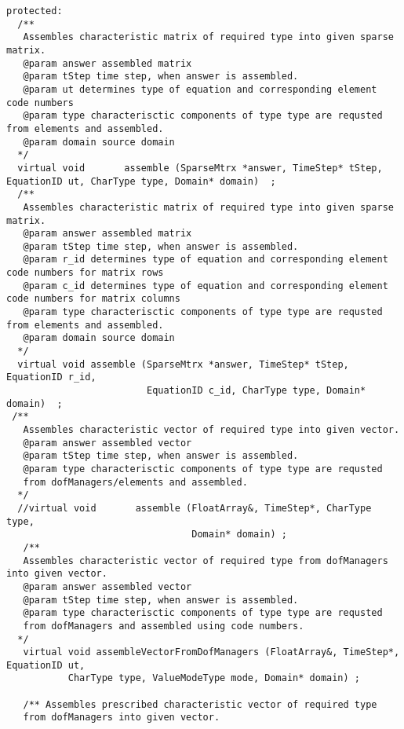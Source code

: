 \documentclass[12pt,draft]{article}
\begin{document}
{\begin{verbatim}
protected:
  /**
   Assembles characteristic matrix of required type into given sparse matrix.
   @param answer assembled matrix
   @param tStep time step, when answer is assembled.
   @param ut determines type of equation and corresponding element code numbers
   @param type characterisctic components of type type are requsted from elements and assembled.
   @param domain source domain
  */
  virtual void       assemble (SparseMtrx *answer, TimeStep* tStep, EquationID ut, CharType type, Domain* domain)  ;
  /**
   Assembles characteristic matrix of required type into given sparse matrix.
   @param answer assembled matrix
   @param tStep time step, when answer is assembled.
   @param r_id determines type of equation and corresponding element code numbers for matrix rows
   @param c_id determines type of equation and corresponding element code numbers for matrix columns
   @param type characterisctic components of type type are requsted from elements and assembled.
   @param domain source domain
  */
  virtual void assemble (SparseMtrx *answer, TimeStep* tStep, EquationID r_id, 
                         EquationID c_id, CharType type, Domain* domain)  ;
 /**
   Assembles characteristic vector of required type into given vector.
   @param answer assembled vector
   @param tStep time step, when answer is assembled.
   @param type characterisctic components of type type are requsted 
   from dofManagers/elements and assembled.
  */
  //virtual void       assemble (FloatArray&, TimeStep*, CharType type, 
                                 Domain* domain) ;
   /**
   Assembles characteristic vector of required type from dofManagers into given vector.
   @param answer assembled vector
   @param tStep time step, when answer is assembled.
   @param type characterisctic components of type type are requsted 
   from dofManagers and assembled using code numbers.
  */
   virtual void assembleVectorFromDofManagers (FloatArray&, TimeStep*, EquationID ut, 
           CharType type, ValueModeType mode, Domain* domain) ;

   /** Assembles prescribed characteristic vector of required type
   from dofManagers into given vector.


\end{verbatim}}
\end{document}
